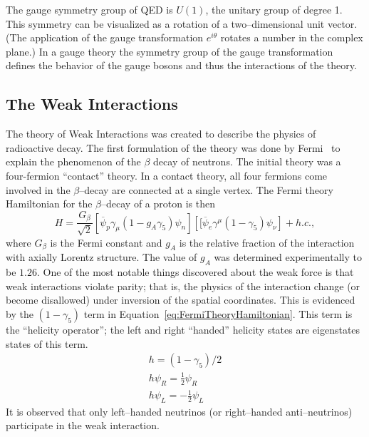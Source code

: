 The gauge symmetry group of QED is $U(1)$, the unitary group of degree 1.  This
symmetry can be visualized as a rotation of a two--dimensional unit vector. (The
application of the gauge transformation $e^{i\theta}$ rotates a number in the
complex plane.)  In a gauge theory the symmetry group of the gauge
transformation defines the behavior of the gauge bosons and thus the
interactions of the theory.  

\subsection{The Weak Interactions}
\label{sec:WeakInteractions}
The theory of Weak Interactions was created to describe the physics of
radioactive decay.  The first formulation of the theory was done by
Fermi~\cite{ref:FermiWeakInteration} to explain the phenomenon of the $\beta$
decay of neutrons. The initial theory was a four-fermion ``contact'' theory.  In
a contact theory, all four fermions come involved in the $\beta$--decay are
connected at a single vertex.  The Fermi theory Hamiltonian for the
$\beta$--decay of a proton is then~\cite{Morii:SMandBSM}
\begin{equation}
  H = \frac{G_\beta}{\sqrt{2}}
  \left[\overline \psi_p \gamma_\mu (1 - g_A\gamma_5)\psi_n\right]
  \left[[\overline \psi_e \gamma^\mu (1 - \gamma_5) \psi_\nu\right] + h.c., 
 \label{eq:FermiTheoryHamiltonian}
\end{equation}
where $G_\beta$ is the Fermi constant and $g_A$ is the relative fraction of the
interaction with axially Lorentz structure.  The value of $g_A$ was determined
experimentally to be $1.26$.  One of the most notable things discovered about
the weak force is that weak interactions violate parity; that is, the physics of
the interaction change (or become disallowed) under inversion of the spatial
coordinates.  This is evidenced by the $(1-\gamma_5)$ term in
Equation~\ref{eq:FermiTheoryHamiltonian}.  This term is the ``helicity
operator''; the left and right ``handed'' helicity states are eigenstates states
of this term.
\begin{eqnarray}
  h = (1 - \gamma_5)/2 \nonumber \\
  h\psi_R = \frac{1}{2}\psi_R \nonumber \\ 
  h\psi_L = -\frac{1}{2}\psi_L \nonumber
\end{eqnarray}
It is observed that only left--handed neutrinos (or right--handed
anti--neutrinos)  participate in the weak
interaction.

